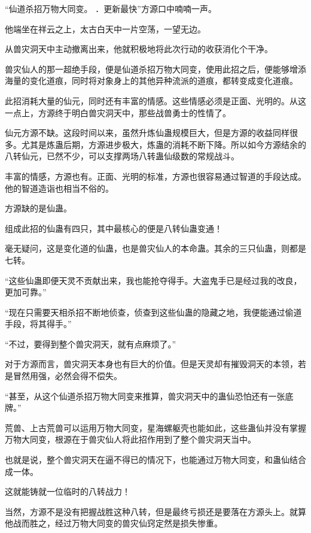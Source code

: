 
\begin{this_body}

“仙道杀招万物大同变。 ．更新最快”方源口中喃喃一声。

他端坐在祥云之上，太古白天中一片空荡，一望无边。

从兽灾洞天中主动撤离出来，他就积极地将此次行动的收获消化个干净。

兽灾仙人的那一超绝手段，便是仙道杀招万物大同变，使用此招之后，便能够增添海量的变化道痕，同时将对象身上的其他异种流派的道痕，都转变成变化道痕。

此招消耗大量的仙元，同时还有丰富的情感。这些情感必须是正面、光明的。从这一点上，方源终于明白兽灾洞天中，那些战兽勇士的性情了。

仙元方源不缺。这段时间以来，虽然升炼仙蛊规模巨大，但是方源的收益同样很多。尤其是炼蛊后期，方源进步极大，炼蛊的消耗不断下降。所以如今方源结余的八转仙元，已然不少，可以支撑两场八转蛊仙级数的常规战斗。

丰富的情感，方源也有。正面、光明的标准，方源也很容易通过智道的手段达成。他的智道造诣也相当不俗的。

方源缺的是仙蛊。

组成此招的仙蛊有四只，其中最核心的便是八转仙蛊变通！

毫无疑问，这是变化道的仙蛊，也是兽灾仙人的本命蛊。其余的三只仙蛊，则都是七转。

“这些仙蛊即便天灵不贡献出来，我也能抢夺得手。大盗鬼手已是经过我的改良，更加可靠。”

“现在只需要天相杀招不断地侦查，侦查到这些仙蛊的隐藏之地，我便能通过偷道手段，将其得手。”

“不过，要得到整个兽灾洞天，就有点麻烦了。”

对于方源而言，兽灾洞天本身也有巨大的价值。但是天灵却有摧毁洞天的本领，若是冒然用强，必然会得不偿失。

“甚至，从这个仙道杀招万物大同变来推算，兽灾洞天中的蛊仙恐怕还有一张底牌。”

荒兽、上古荒兽可以运用万物大同变，星海螺躯壳也能如此，这些蛊仙并没有掌握万物大同变，根源在于兽灾仙人将此招作用到了整个兽灾洞天当中。

也就是说，整个兽灾洞天在逼不得已的情况下，也能通过万物大同变，和蛊仙结合成一体。

这就能铸就一位临时的八转战力！

当然，方源不是没有把握战胜这种八转，但是最终亏损还是要落在方源头上。就算他战而胜之，经过万物大同变的兽灾仙窍定然是损失惨重。


\end{this_body}
